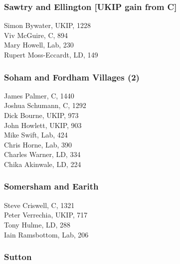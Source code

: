 \documentclass[a4paper,openany,10pt]{book}
\begin{document}
\subsubsection*{Sawtry and Ellington \hspace*{\fill}\nolinebreak[1]%
\enspace\hspace*{\fill}
[UKIP gain from C]}



Simon Bywater, UKIP, 1228\\
Viv McGuire, C, 894\\
Mary Howell, Lab, 230\\
Rupert Moss-Eccardt, LD, 149\\


\subsubsection*{Soham and Fordham Villages (2)}



James Palmer, C, 1440\\
Joshua Schumann, C, 1292\\
Dick Bourne, UKIP, 973\\
John Howlett, UKIP, 903\\
Mike Swift, Lab, 424\\
Chris Horne, Lab, 390\\
Charles Warner, LD, 334\\
Chika Akinwale, LD, 224\\


\subsubsection*{Somersham and Earith}



Steve Criswell, C, 1321\\
Peter Verrechia, UKIP, 717\\
Tony Hulme, LD, 288\\
Iain Ramsbottom, Lab, 206\\


\subsubsection*{Sutton}
\end{document}
